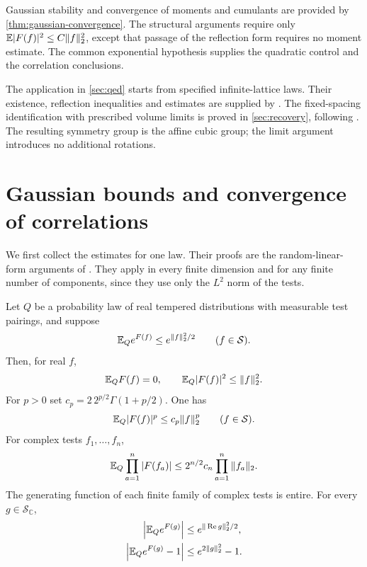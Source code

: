 Gaussian stability and convergence of moments and cumulants are
provided by \cref{thm:gaussian-convergence}.
The structural arguments require only
\(\mathbb E|F(f)|^2\le C\|f\|_2^2\), except that passage of the reflection
form requires no moment estimate. The common exponential hypothesis
supplies the quadratic control and the correlation conclusions.

The application in \cref{sec:qed} starts from specified
infinite-lattice laws. Their existence, reflection inequalities
and estimates are supplied by \cite[Theorem~A]{ChamberLattice}.
The fixed-spacing identification with prescribed volume limits is
proved in \cref{sec:recovery}, following
\cite[Section~6.4]{QED3Manuscript}.
The resulting symmetry group is the affine cubic group; the limit
argument introduces no additional rotations.


\section{Gaussian bounds and convergence of correlations}\label{sec:gaussian}
We first collect the estimates for one law. Their proofs are
the random-linear-form arguments of
\cite[Proposition~5.1 and Section~5.2]{QED3Manuscript}.
They apply in every finite dimension and for any finite number
of components, since they use only the $L^2$ norm of the tests.

\begin{proposition}\label{prop:subgaussian}
Let $Q$ be a probability law of real tempered distributions
with measurable test pairings, and suppose
\begin{equation}\label{eq:probability-G}
 \mathbb E_Q e^{F(f)}\le e^{\|f\|_2^2/2}\qquad(f\in\mathcal S).
\end{equation}
Then, for real $f$,
\begin{equation}\label{eq:field-variance}
 \mathbb E_Q F(f)=0,\qquad \mathbb E_Q|F(f)|^2\le\|f\|_2^2.
\end{equation}
For $p>0$ set $c_p=2\,2^{p/2}\Gamma(1+p/2)$. One has
\[
 \mathbb E_Q|F(f)|^p\le c_p\|f\|_2^p\qquad(f\in\mathcal S).
\]
For complex tests $f_1,\ldots,f_n$,
\begin{equation}\label{eq:joint-moment-bound}
 \mathbb E_Q\prod_{a=1}^n|F(f_a)|
       \le 2^{n/2}c_n\prod_{a=1}^n\|f_a\|_2.
\end{equation}
The generating function of each finite family of complex tests
is entire. For every $g\in\mathcal S_{\mathbb C}$,
\begin{align}
 \left|\mathbb E_Q e^{F(g)}\right|
       &\le e^{\|\operatorname{Re}g\|_2^2/2},
                      \label{eq:entire-generating-bound}\\
 \left|\mathbb E_Q e^{F(g)}-1\right|
       &\le e^{2\|g\|_2^2}-1. \label{eq:zero-free-bound}
\end{align}
\end{proposition}

